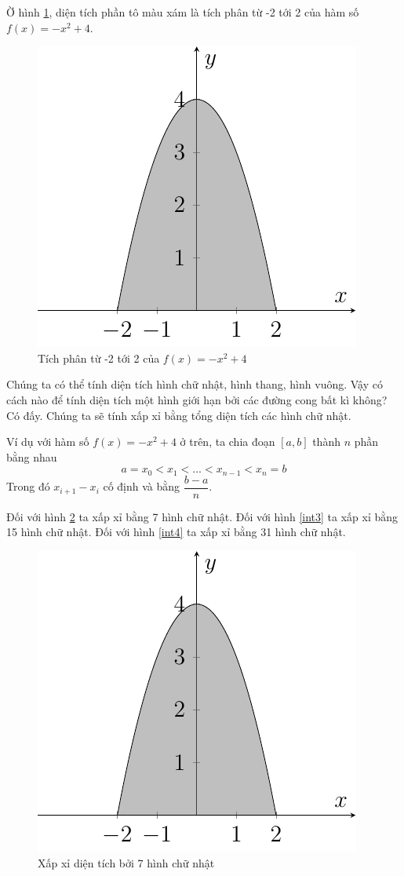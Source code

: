 Ờ hình \ref{int1}, diện tích phần tô màu xám là tích phân từ -2 tới 2 của hàm số $f(x) = -x^2 + 4$.

\begin{figure}[ht]
	\centering
	\includegraphics[page=1]{analytic_geometry/int1.pdf}
	\caption{Tích phân từ -2 tới 2 của $f(x) = -x^2 + 4$}
	\label{int1}
\end{figure}

Chúng ta có thể tính diện tích hình chữ nhật, hình thang, hình vuông. Vậy có cách nào để tính diện tích một hình giới hạn bởi các đường cong bất kì không? Có đấy. Chúng ta sẽ tính xấp xỉ bằng tổng diện tích các hình chữ nhật.

Ví dụ với hàm số $f(x) = -x^2 + 4$ ở trên, ta chia đoạn $[a, b]$ thành $n$ phần bằng nhau \[a = x_0 < x_1 < \ldots < x_{n-1} < x_n = b\]
Trong đó $x_{i+1} - x_i$ cố định và bằng $\dfrac{b-a}{n}$.

Đối với hình \ref{int2} ta xấp xỉ bằng 7 hình chữ nhật. Đối với hình \ref{int3} ta xấp xỉ bằng 15 hình chữ nhật. Đối với hình \ref{int4} ta xấp xỉ bằng 31 hình chữ nhật. 

\begin{figure}[htb]
	\centering
	\includegraphics[page=2]{analytic_geometry/int1.pdf}
	\caption{Xấp xỉ diện tích bởi 7 hình chữ nhật}
	\label{int2}
\end{figure}

